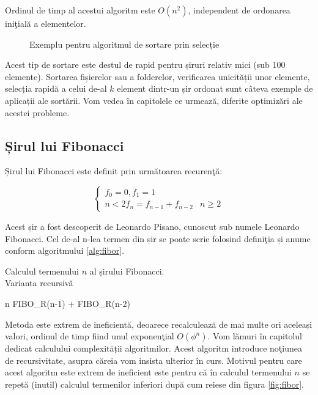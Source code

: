 Ordinul de timp al acestui algoritm este $O(n^{2})$, independent de ordonarea iniţială a elementelor. 

\begin{figure}[H] %
	\centering	
	{
	}
	\caption{Exemplu pentru algoritmul de sortare prin selecție} 
	\label{fig:sortareselectie}
\end{figure}

Acest tip de sortare este destul de rapid pentru șiruri relativ mici (sub 100 elemente). Sortarea fișierelor sau a folderelor, verificarea unicității unor elemente, selecția rapidă a celui de-al $k$ element dintr-un șir ordonat sunt câteva exemple de aplicații ale sortării. Vom vedea în capitolele ce urmează, diferite optimizări ale acestei probleme.


\subsection{Șirul lui Fibonacci}


Șirul lui Fibonacci este definit prin următoarea recurenţă:

\begin{equation}
\left\{\begin{matrix}
f_{0}=0, f_{1}=1 &  \\ n < 2
f_{n} =  f_{n-1} + f_{n-2} & n\geq 2
\end{matrix}\right.
\end{equation}


Acest șir a fost descoperit de Leonardo Pisano, cunoscut sub numele Leonardo Fibonacci. Cel de-al n-lea termen din șir se poate scrie folosind definiţia și anume conform algoritmului \ref{alg:fibor}.

\begin{algorithm}
	\caption{Calculul termenului $n$ al șirului Fibonacci.\\ Varianta recursivă}\label{alg:fibor}
	\begin{algorithmic}[1]		
			 \hspace{3pt}
		\Return n			
		\Else \hspace{3pt}
		\Return FIBO\_R(n-1) + FIBO\_R(n-2)
		\EndIf
		\EndProcedure
	\end{algorithmic}
\end{algorithm}

Metoda este extrem de ineficientă, deoarece recalculează de mai multe ori aceleași valori, ordinul de timp fiind unul exponenţial $O(\phi^{n})$. Vom lămuri în capitolul dedicat calculului complexității algoritmilor. Acest algoritm introduce noţiunea de recursivitate, asupra căreia vom insista ulterior în curs.
Motivul pentru care acest algoritm este extrem de ineficient este pentru că în calculul termenului $n$ se repetă (inutil) calculul termenilor inferiori după cum reiese din figura \ref{fig:fibor}.

